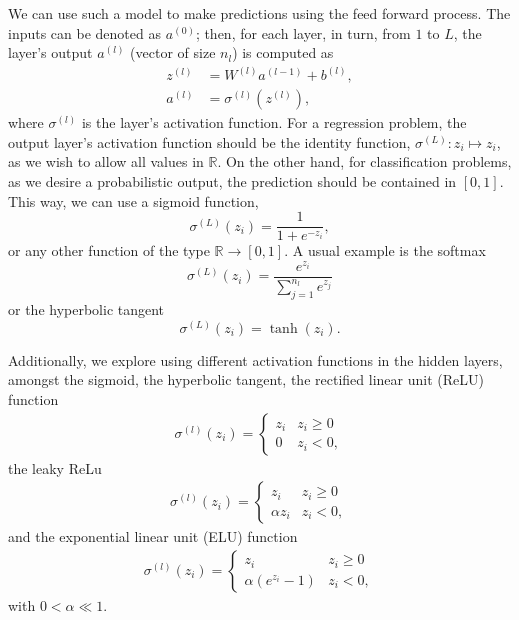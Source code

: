 \documentclass[aps,reprint,superscriptaddress,nofootinbib]{revtex4-2}
\begin{document}
We can use such a model to make predictions using the feed forward process.
The inputs can be denoted as $a^{(0)}$; then, for each layer, in turn, from $1$ to $L$, the layer's output $a^{(l)}$ (vector of size $n_{l}$) is computed as
\begin{align*}
    z^{(l)} &= W^{(l)} a^{(l-1)} + b^{(l)},
    \\
    a^{(l)} &= \sigma^{(l)} ( z^{(l)} ),
\end{align*}
where $\sigma^{(l)}$ is the layer's activation function. For a regression problem, the output layer's activation function should be the identity function, $\sigma^{(L)} : z_i \mapsto z_i$, as we wish to allow all values in \(\mathbb{R}\). On the other hand, for classification problems, as we desire a probabilistic output, the prediction should be contained in \([0, 1]\). This way, we can use a sigmoid function,
\begin{equation*}
    \sigma^{(L)}(z_i) = \frac{1}{1+e^{-z_i}},
\end{equation*}
or any other function of the type \(\mathbb{R} \to [0, 1]\). A usual example is the softmax
\begin{equation*}
    \sigma^{(L)}(z_i) = \frac{e^{z_i}}{\sum_{j = 1}^{n_l} e^{z_j}}
\end{equation*}
or the hyperbolic tangent
\begin{equation*}
    \sigma^{(L)}(z_i) = \tanh (z_i).
\end{equation*}

Additionally, we explore using different activation functions in the hidden layers, amongst the sigmoid, the hyperbolic tangent, the rectified linear unit (ReLU) function
\begin{align*}
    \sigma^{(l)}(z_i) = 
    \begin{cases}
        z_i &z_i \geq 0
        \\
        0 &z_i < 0,
    \end{cases}
\end{align*}
the leaky ReLu
\begin{align*}
    \sigma^{(l)}(z_i) = 
    \begin{cases}
        z_i &z_i \geq 0
        \\
        \alpha z_i &z_i < 0,
    \end{cases}
\end{align*}
and the exponential linear unit (ELU) function
\begin{align*}
    \sigma^{(l)}(z_i) = 
    \begin{cases}
        z_i &z_i \geq 0
        \\
        \alpha \left(e^{z_i} - 1\right) &z_i < 0,
    \end{cases}
\end{align*}
with \(0 < \alpha \ll 1\).
\end{document}
